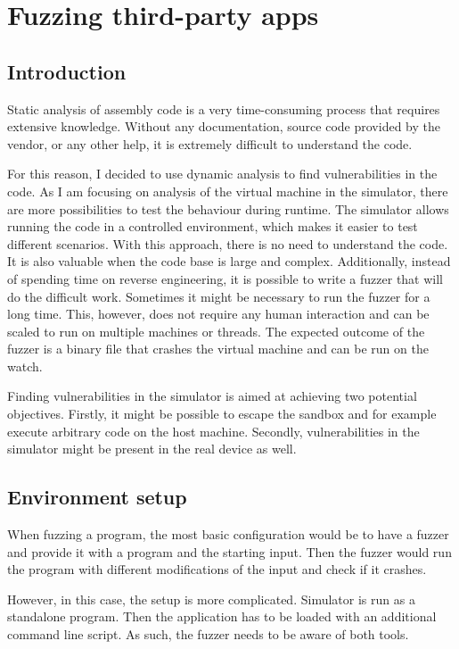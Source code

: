\chapter{Fuzzing third-party apps} \label{sec:fuzzing}
\section{Introduction}
Static analysis of assembly code is a very time-consuming process that requires extensive knowledge.
Without any documentation, source code provided by the vendor, or any other help, it is extremely difficult to understand the code.

For this reason, I decided to use dynamic analysis to find vulnerabilities in the code.
As I am focusing on analysis of the virtual machine in the simulator, there are more possibilities to test the behaviour during runtime.
The simulator allows running the code in a controlled environment, which makes it easier to test different scenarios.
With this approach, there is no need to understand the code.
It is also valuable when the code base is large and complex.
Additionally, instead of spending time on reverse engineering, it is possible to write a fuzzer that will do the difficult work.
Sometimes it might be necessary to run the fuzzer for a long time.
This, however, does not require any human interaction and can be scaled to run on multiple machines or threads.
The expected outcome of the fuzzer is a binary file that crashes the virtual machine and can be run on the watch.

Finding vulnerabilities in the simulator is aimed at achieving two potential objectives.
Firstly, it might be possible to escape the sandbox and for example execute arbitrary code on the host machine.
Secondly, vulnerabilities in the simulator might be present in the real device as well.

\section{Environment setup}
When fuzzing a program, the most basic configuration would be to have a fuzzer and provide it with a program and the starting input.
Then the fuzzer would run the program with different modifications of the input and check if it crashes.

However, in this case, the setup is more complicated.
Simulator is run as a standalone program.
Then the application has to be loaded with an additional command line script.
As such, the fuzzer needs to be aware of both tools.

